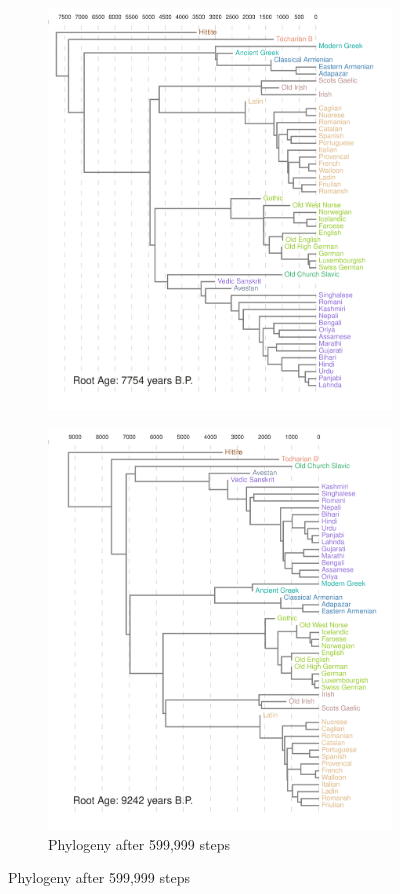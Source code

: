 \documentclass[10pt,journal,compsoc]{IEEEtran}
\begin{document}
\begin{figure}
\begin{subfigure}[b]{0.4\paperwidth}
         \includegraphics[width=\textwidth]{runs26-conv2}
         \label{fig:convtree2}
     \end{subfigure}
     \newline
     \begin{subfigure}[b]{0.4\paperwidth}
         \centering
         \caption{Phylogeny after 599,999 steps}
         \includegraphics[width=\textwidth]{runs26-conv3}

\end{subfigure}
\end{figure}
\end{document}
